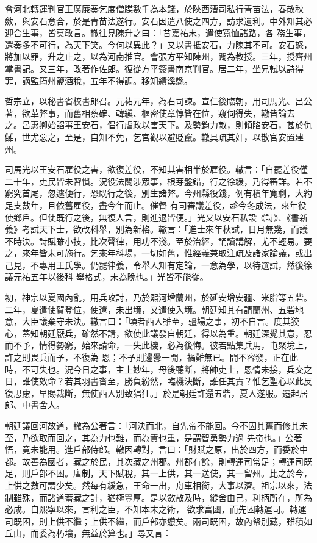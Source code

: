 \begin{pinyinscope}
 會河北轉運判官王廣廉奏乞度僧牒數千為本錢，於陜西漕司私行青苗法，春散秋斂，與安石意合，於是青苗法遂行。安石因遣八使之四方，訪求遺利。中外知其必迎合生事，皆莫敢言。轍往見陳升之曰：「昔嘉祐末，遣使寬恤諸路，各
 務生事，還奏多不可行，為天下笑。今何以異此？」又以書抵安石，力陳其不可。安石怒，將加以罪，升之止之，以為河南推官。會張方平知陳州，闢為教授。三年，授齊州掌書記。又三年，改著作佐郎。復從方平簽書南京判官。居二年，坐兄軾以詩得罪，謫監筠州鹽酒稅，五年不得調。移知績溪縣。



 哲宗立，以秘書省校書郎召。元祐元年，為右司諫。宣仁後臨朝，用司馬光、呂公著，欲革弊事，而舊相蔡確、韓縝、樞密使章惇皆在位，窺伺得失，轍皆論去
 之。呂惠卿始諂事王安石，倡行虐政以害天下。及勢鈞力敵，則傾陷安石，甚於仇讎，世尤惡之，至是，自知不免，乞宮觀以避貶竄。轍具疏其奸，以散官安置建州。



 司馬光以王安石雇役之害，欲復差役，不知其害相半於雇役。轍言：「自罷差役僅二十年，吏民皆未習慣。況役法關涉眾事，根芽盤錯，行之徐緩，乃得審詳。若不窮究首尾，忽遽便行，恐既行之後，別生諸弊。今州縣役錢，例有積年寬剩，大約足支數年，且依舊雇役，盡今年而止。催督
 有司審議差役，趁今冬成法，來年役使鄉戶。但使既行之後，無復人言，則進退皆便。」光又以安石私設《詩》、《書新義》考試天下士，欲改科舉，別為新格。轍言：「進士來年秋試，日月無幾，而議不時決。詩賦雖小技，比次聲律，用功不淺。至於治經，誦讀講解，尤不輕易。要之，來年皆未可施行。乞來年科場，一切如舊，惟經義兼取注疏及諸家論議，或出己見，不專用王氏學。仍罷律義，令舉人知有定論，一意為學，以待選試，然後徐議元祐五年以後科
 舉格式，未為晚也。」光皆不能從。



 初，神宗以夏國內亂，用兵攻討，乃於熙河增蘭州，於延安增安疆、米脂等五砦。二年，夏遣使賀登位，使還，未出境，又遣使入境。朝廷知其有請蘭州、五砦地意，大臣議棄守未決。轍言曰：「頃者西人雖至，疆場之事，初不自言。度其狡心，蓋知朝廷厭兵，確然不請，欲使此議發自朝廷，得以為重。朝廷深覺其意，忍而不予，情得勢窮，始來請命，一失此機，必為後悔。彼若點集兵馬，屯聚境上，許之則畏兵而予，不復為
 恩；不予則邊釁一開，禍難無已。間不容發，正在此時，不可失也。況今日之事，主上妙年，母後聽斷，將帥吏士，恩情未接，兵交之日，誰使效命？若其羽書沓至，勝負紛然，臨機決斷，誰任其責？惟乞聖心以此反復思慮，早賜裁斷，無使西人別致猖狂。」於是朝廷許還五砦，夏人遂服。遷起居郎、中書舍人。



 朝廷議回河故道，轍為公著言：「河決而北，自先帝不能回。今不因其舊而修其未至，乃欲取而回之，其為力也難，而為責也重，是謂智勇勢力過
 先帝也。」公著悟，竟未能用。進戶部侍郎。轍因轉對，言曰：「財賦之原，出於四方，而委於中都。故善為國者，藏之於民，其次藏之州郡。州郡有餘，則轉運司常足；轉運司既足，則戶部不困。唐制，天下賦稅，其一上供，其一送使，其一留州。比之於今，上供之數可謂少矣。然每有緩急，王命一出，舟車相銜，大事以濟。祖宗以來，法制雖殊，而諸道蓄藏之計，猶極豐厚。是以斂散及時，縱舍由己，利柄所在，所為必成。自熙寧以來，言利之臣，不知本末之術，
 欲求富國，而先困轉運司。轉運司既困，則上供不繼；上供不繼，而戶部亦憊矣。兩司既困，故內帑別藏，雖積如丘山，而委為朽壤，無益於算也。」尋又言：




\end{pinyinscope}
